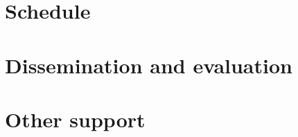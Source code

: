 \documentclass[onecolumn,a4paper,12pt]{article}
\begin{document}
\lipsum[1-5]


\section{Schedule}


\lipsum[1-5]


\section{Dissemination and evaluation}


\lipsum[1-5]


\section{Other support}



\lipsum[1-5]



\newpage


\end{document}
